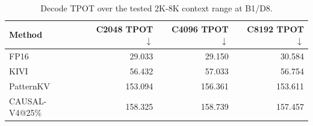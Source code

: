 \begin{table}[t]
\centering
\small
\caption{Decode TPOT over the tested 2K-8K context range at B1/D8.}
\label{tab:context-scaling}
\begin{tabular}{lrrr}
\toprule
Method & C2048 TPOT $\downarrow$ & C4096 TPOT $\downarrow$ & C8192 TPOT $\downarrow$ \\
\midrule
FP16 & 29.033 & 29.150 & 30.584 \\
KIVI & 56.432 & 57.033 & 56.754 \\
PatternKV & 153.094 & 156.361 & 153.611 \\
CAUSAL-V4@25\% & 158.325 & 158.739 & 157.457 \\
\bottomrule
\end{tabular}
\end{table}
